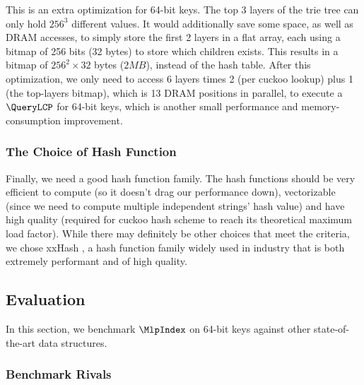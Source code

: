 \documentclass[11pt, usletter]{article}
\begin{document}
This is an extra optimization for 64-bit keys.
The top 3 layers of the trie tree can only hold $256^3$ different values. 
It would additionally save some space, as well as DRAM accesses, to simply store the first 2 layers
in a flat array, each using a bitmap of 256 bits (32 bytes) to store which children exists. 
This results in a bitmap of $256^2\times 32$ bytes ($2MB$), instead of the hash table. 
After this optimization, we only need to access 6 layers times 2 (per cuckoo lookup) plus 1 (the top-layers bitmap), 
which is 13 DRAM positions in parallel, to execute a $\QueryLCP$ for 64-bit keys, 
which is another small performance and memory-consumption improvement.
 
\subsubsection*{The Choice of Hash Function}

Finally, we need a good hash function family.
The hash functions should be very efficient to compute (so it doesn't drag our performance down), 
vectorizable (since we need to compute multiple independent strings' hash value) 
and have high quality (required for cuckoo hash scheme to reach its theoretical maximum load factor).
While there may definitely be other choices that meet the criteria, 
we chose xxHash \cite{xxhash}, 
a hash function family widely used in industry that is both extremely performant and of high quality.

\subsection{Evaluation} \label{mlpindex_eval}

In this section, we benchmark $\MlpIndex$ on 64-bit keys against other state-of-the-art data structures. 

\subsubsection*{Benchmark Rivals}
\end{document}
